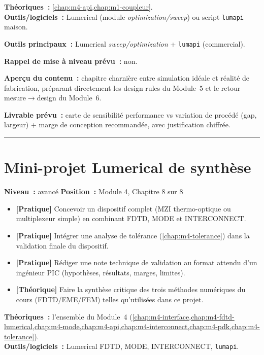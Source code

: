 \begin{prerequis}
\textbf{Théoriques~:} \cref{chap:m4-api,chap:m1-coupleur}.\\
\textbf{Outils/logiciels~:} Lumerical (module \emph{optimization/sweep}) ou script \texttt{lumapi} maison.
\end{prerequis}

\noindent\textbf{Outils principaux~:} Lumerical \emph{sweep/optimization} + \texttt{lumapi} (commercial).

\noindent\textbf{Rappel de mise à niveau prévu~:} non.

\noindent\textbf{Aperçu du contenu~:} chapitre charnière entre simulation \og idéale\fg{} et réalité de fabrication, préparant directement les design rules du Module~5 et le retour mesure$\to$design du Module~6.

\noindent\textbf{Livrable prévu~:} carte de sensibilité performance vs variation de procédé (gap, largeur) + marge de conception recommandée, avec justification chiffrée.

\bigskip\hrule\bigskip

\chapter{Mini-projet Lumerical de synthèse}
\label{chap:m4-projet}

\noindent\textbf{Niveau~:} avancé \hfill \textbf{Position~:} Module 4, Chapitre 8 sur 8

\begin{objectifs}
\begin{itemize}[leftmargin=1.4em]
  \item \textbf{[Pratique]} Concevoir un dispositif complet (MZI thermo-optique ou multiplexeur simple) en combinant FDTD, MODE et INTERCONNECT.
  \item \textbf{[Pratique]} Intégrer une analyse de tolérance (\cref{chap:m4-tolerance}) dans la validation finale du dispositif.
  \item \textbf{[Pratique]} Rédiger une note technique de validation au format attendu d'un ingénieur PIC (hypothèses, résultats, marges, limites).
  \item \textbf{[Théorique]} Faire la synthèse critique des trois méthodes numériques du cours (FDTD/EME/FEM) telles qu'utilisées dans ce projet.
\end{itemize}
\end{objectifs}

\begin{prerequis}
\textbf{Théoriques~:} l'ensemble du Module~4 (\cref{chap:m4-interface,chap:m4-fdtd-lumerical,chap:m4-mode,chap:m4-api,chap:m4-interconnect,chap:m4-pdk,chap:m4-tolerance}).\\
\textbf{Outils/logiciels~:} Lumerical FDTD, MODE, INTERCONNECT, \texttt{lumapi}.
\end{prerequis}

